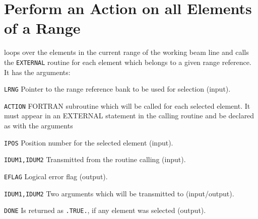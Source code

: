 \section{Perform an Action on all Elements of a Range}
\label{ENSRNG}
loops over the elements in the current range of the working beam line
and calls the {\tt EXTERNAL} routine  for each element
which belongs to a given range reference.
It has the arguments:
\begin{mylist}
\item[\tt LRNG]
Pointer to the range reference bank to be used for selection (input).
\item[\tt ACTION]
FORTRAN subroutine which will be called for each selected element.
It must appear in an EXTERNAL statement in the calling routine
and be declared as
with the arguments
\begin{mylist}
\item[\tt IPOS]
Position number for the selected element (input).
\item[\tt IDUM1,IDUM2]
Transmitted from the routine calling  (input).
\item[\tt EFLAG]
Logical error flag (output).
\end{mylist}
\item[\tt IDUM1,IDUM2]
Two arguments which will be transmitted to 
(input/output).
\item[\tt DONE]
Is returned as {\tt .TRUE.}, if any element was selected (output).
\end{mylist}


